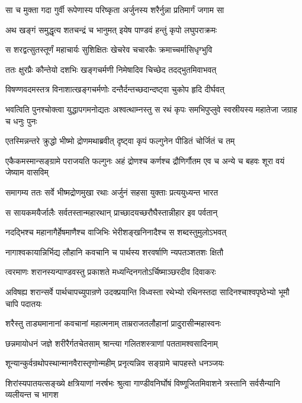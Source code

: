 \twolineshloka
{सा च मुक्ता गदा गुर्वी रूपेणास्य परिष्कृता}
{अर्जुनस्य शरैर्नुन्ना प्रतिमार्गं जगाम सा}


\twolineshloka
{अथ खङ्गं समुद्धृत्य शतचन्द्रं च भानुमत्}
{इयेष पाण्डवं हन्तुं कृपो लघुपराक्रमः}


\twolineshloka
{स शरद्वत्सुतस्तूर्णं महाचार्यः सुशिक्षितः}
{खेचरेव चचारकैः क्रमाच्चर्मासिधृग्भुवि}


\twolineshloka
{ततः क्षुरप्रैः कौन्तेयो दशभिः खङ्गचर्मणी}
{निमेषादिव चिच्छेद तदद्भुतमिवाभवत्}


\twolineshloka
{विषण्णवदमस्तत्र विनाशात्खङ्गचर्मणोः}
{दन्तैर्दन्तच्छदान्दष्ट्वा चुकोप हृदि दीर्घवत्}


\threelineshloka
{भवत्विति पुनश्चोक्त्वा युद्धापगमनोद्यतः}
{अश्वत्थाम्नस्तु स रथं कृपः समभिपुप्लुवे}
{स्वस्रीयस्य महातेजा जग्राह च धनुः पुनः}


\twolineshloka
{एतस्मिन्नन्तरे क्रुद्धो भीष्मो द्रोणमथाब्रवीत्}
{दृष्ट्वा कृपं फल्गुनेन पीडितं चोर्जितं च तम्}


\threelineshloka
{एकैकमस्मान्सङ्ग्रामे पराजयति फल्गुनः}
{अहं द्रोणश्च कर्णश्च द्रौणिर्गौतम एव च}
{अन्ये च बहवः शूरा वयं जेष्याम वासविम्}


\twolineshloka
{समागम्य ततः सर्वे भीष्मद्रोणमुखा रथाः}
{अर्जुनं सहसा युक्ताः प्रत्ययुध्यन्त भारत}


\twolineshloka
{स सायकमयैर्जालैः सर्वतस्तान्महारथान्}
{प्राच्छादयच्छरौघैस्तान्नीहार इव पर्वतान्}


\twolineshloka
{नदद्भिश्च महानागैर्हेषमाणैश्च वाजिभिः}
{भेरीशङ्खनिनादैश्च स शब्दस्तुमुलोऽभवत्}


\twolineshloka
{नागाश्वकायान्निर्भिद्य लौहानि कवचानि च}
{पार्थस्य शरवर्षाणि न्यपतञ्शतशः क्षितौ}


\twolineshloka
{त्वरमाणः शरानस्यन्पाण्डवस्तु प्रकाशते}
{मध्यन्दिनगतोऽर्चिष्माञ्छरदीव दिवाकरः}


\threelineshloka
{अविषह्य शरान्सर्वे पार्थचापच्युपान्रणे}
{उदक्प्रयान्ति विध्वस्ता रथेभ्यो रथिनस्तदा}
{सादिनश्चाश्वपृष्ठेभ्यो भूमौ चापि पदातयः}


\twolineshloka
{शरैस्तु ताड्यमानानां कवचानां महात्मनाम्}
{ताम्रराजतलौहानां प्रादुरासीन्महास्वनः}


\twolineshloka
{छन्नमायोधनं जज्ञे शरीरैर्गतचेतसाम्}
{श्रान्त्या गलितशस्त्राणां पततामश्वसादिनाम्}


\twolineshloka
{शून्यान्कुर्वन्रथोपस्थान्मानवैरास्तृणोन्महीम्}
{प्रनृत्यन्निव सङ्ग्रामे चापहस्ते धनञ्जयः}


\threelineshloka
{शिरांस्यपातयत्सङ्ख्ये क्षत्रियाणां नरर्षभः}
{श्रुत्वा गाण्डीवनिर्घोषं विष्णूजितमिवाशने}
{त्रस्तानि सर्वसैन्यानि व्यलीयन्त च भागश}



